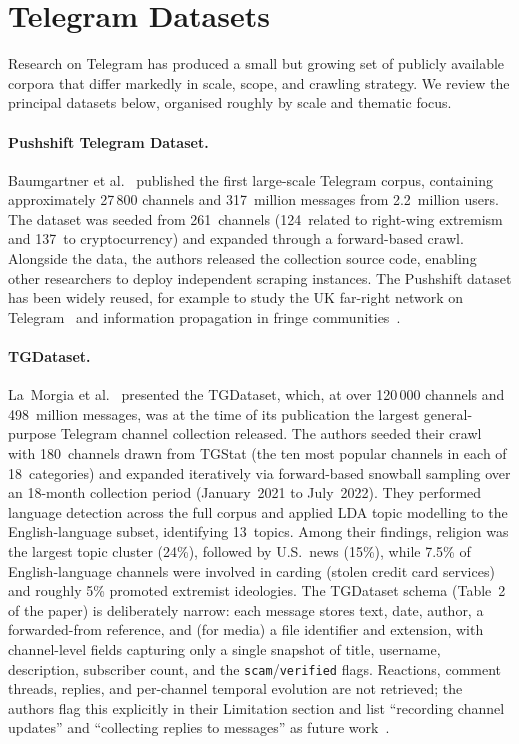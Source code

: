 \section{Telegram Datasets}
\label{sec:telegram-datasets}

Research on Telegram has produced a small but growing set of publicly available corpora that differ markedly in scale, scope, and crawling strategy.
We review the principal datasets below, organised roughly by scale and thematic focus.

\paragraph{Pushshift Telegram Dataset.}
Baumgartner et al.~\cite{baumgartner2020} published the first large-scale Telegram corpus, containing approximately 27\,800 channels and 317~million messages from 2.2~million users.
The dataset was seeded from 261~channels (124~related to right-wing extremism and 137~to cryptocurrency) and expanded through a forward-based crawl.
Alongside the data, the authors released the collection source code, enabling other researchers to deploy independent scraping instances.
The Pushshift dataset has been widely reused, for example to study the UK far-right network on Telegram~\cite{bovet2022} and information propagation in fringe communities~\cite{hoseini2024}.

\paragraph{TGDataset.}
La~Morgia et al.~\cite{lamorgia2025} presented the TGDataset, which, at over 120\,000 channels and 498~million messages, was at the time of its publication the largest general-purpose Telegram channel collection released.
The authors seeded their crawl with 180~channels drawn from TGStat (the ten most popular channels in each of 18~categories) and expanded iteratively via forward-based snowball sampling over an 18-month collection period (January~2021 to July~2022).
They performed language detection across the full corpus and applied LDA topic modelling to the English-language subset, identifying 13~topics.
Among their findings, religion was the largest topic cluster (24\%), followed by U.S.\ news (15\%), while 7.5\% of English-language channels were involved in carding (stolen credit card services) and roughly 5\% promoted extremist ideologies.
The TGDataset schema (Table~2 of the paper) is deliberately narrow: each message stores text, date, author, a forwarded-from reference, and (for media) a file identifier and extension, with channel-level fields capturing only a single snapshot of title, username, description, subscriber count, and the \texttt{scam}/\texttt{verified} flags.
Reactions, comment threads, replies, and per-channel temporal evolution are not retrieved; the authors flag this explicitly in their Limitation section and list ``recording channel updates'' and ``collecting replies to messages'' as future work~\cite{lamorgia2025}.

